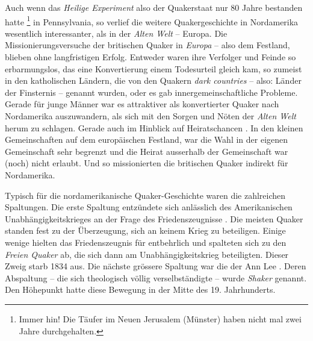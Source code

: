 \medskip

Auch wenn das \textit{Heilige Experiment} also der Quakerstaat nur 80 Jahre
bestanden hatte \footnote{Immer hin! Die Täufer im Neuen Jerusalem (Münster)
  haben
nicht mal zwei Jahre durchgehalten.} in Pennsylvania, so verlief die weitere
Quakergeschichte in Nordamerika wesentlich interessanter, als in der
\textit{Alten
Welt} -- Europa. Die Missionierungsversuche  der britischen
Quaker in
\textit{Europa}  -- also dem Festland, blieben ohne
langfristigen Erfolg.
Entweder waren ihre Verfolger  und Feinde so erbarmungslos,
das eine
Konvertierung einem Todesurteil gleich kam, so zumeist in den katholischen
Ländern, die von den Quakern \textit{dark countries}  -- also: Länder der
Finsternis -- genannt wurden, oder es gab innergemeinschaftliche Probleme.
Gerade
für junge Männer war es attraktiver als konvertierter Quaker nach Nordamerika
auszuwandern, als sich mit den Sorgen und Nöten der \textit{Alten Welt} herum
zu
schlagen. Gerade auch im Hinblick auf Heiratschancen . In den
kleinen
Gemeinschaften auf dem europäischen Festland, war die Wahl in der eigenen
Gemeinschaft sehr begrenzt und die Heirat ausserhalb der Gemeinschaft war (noch)
nicht erlaubt. Und so missionierten die britischen Quaker indirekt für
Nordamerika.

\medskip

Typisch für die nordamerikanische Quaker-Geschichte waren die zahlreichen
Spaltungen. Die erste Spaltung  entzündete sich anlässlich des
Amerikanischen
Unabhängigkeitskrieges an der Frage des Friedenszeugnisse
. Die meisten Quaker
standen fest zu der Überzeugung, sich an keinem Krieg  zu
beteiligen. Einige
wenige hielten das Friedenszeugnis für entbehrlich und spalteten sich zu den
\textit{Freien Quaker}   ab,
die sich dann am Unabhängigkeitskrieg 
beteiligten. Dieser Zweig starb 1834 aus. Die nächste grössere Spaltung war die
der Ann Lee . Deren Abspaltung -- die sich theologisch
völlig verselbständigte --
wurde \textit{Shaker}  genannt. Den Höhepunkt hatte
diese Bewegung in der Mitte
des 19. Jahrhunderts.

\medskip

